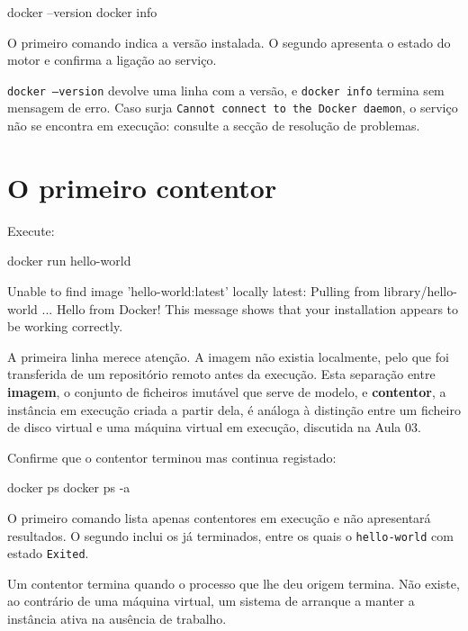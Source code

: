 \documentclass[11pt,a4paper]{article}
\begin{document}
\begin{terminal}
docker --version
docker info
\end{terminal}

O primeiro comando indica a versão instalada. O segundo apresenta o estado do motor e confirma a ligação ao serviço.

\begin{verificar}
\texttt{docker --version} devolve uma linha com a versão, e \texttt{docker info} termina sem mensagem de erro. Caso surja \texttt{Cannot connect to the Docker daemon}, o serviço não se encontra em execução: consulte a secção de resolução de problemas.
\end{verificar}

\section{O primeiro contentor}

Execute:

\begin{terminal}
docker run hello-world
\end{terminal}

\begin{saida}
Unable to find image 'hello-world:latest' locally
latest: Pulling from library/hello-world
...
Hello from Docker!
This message shows that your installation appears to be working correctly.
\end{saida}

A primeira linha merece atenção. A imagem não existia localmente, pelo que foi transferida de um repositório remoto antes da execução. Esta separação entre \textbf{imagem}, o conjunto de ficheiros imutável que serve de modelo, e \textbf{contentor}, a instância em execução criada a partir dela, é análoga à distinção entre um ficheiro de disco virtual e uma máquina virtual em execução, discutida na Aula 03.

Confirme que o contentor terminou mas continua registado:

\begin{terminal}
docker ps
docker ps -a
\end{terminal}

O primeiro comando lista apenas contentores em execução e não apresentará resultados. O segundo inclui os já terminados, entre os quais o \texttt{hello-world} com estado \texttt{Exited}.

\begin{nota}
Um contentor termina quando o processo que lhe deu origem termina. Não existe, ao contrário de uma máquina virtual, um sistema de arranque a manter a instância ativa na ausência de trabalho.
\end{nota}
\end{document}
